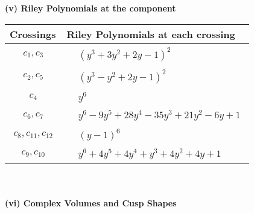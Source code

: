 \documentclass[1p]{elsarticle_modified}
\theoremstyle{definition}
\begin{document}
\newpage\renewcommand{\arraystretch}{1}
\flushleft \textbf{(v) Riley Polynomials at the component}\newline \\
\begin{tabular}{m{50pt}|m{274pt}}
Crossings & \hspace{64pt}Riley Polynomials at each crossing \\
\hline $$\begin{aligned}c_{1},c_{3}\end{aligned}$$&$\begin{aligned}
&(y^3+3 y^2+2 y-1)^2
\end{aligned}$\\
\hline $$\begin{aligned}c_{2},c_{5}\end{aligned}$$&$\begin{aligned}
&(y^3- y^2+2 y-1)^2
\end{aligned}$\\
\hline $$\begin{aligned}c_{4}\end{aligned}$$&$\begin{aligned}
&y^6
\end{aligned}$\\
\hline $$\begin{aligned}c_{6},c_{7}\end{aligned}$$&$\begin{aligned}
&y^6-9 y^5+28 y^4-35 y^3+21 y^2-6 y+1
\end{aligned}$\\
\hline $$\begin{aligned}c_{8},c_{11},c_{12}\end{aligned}$$&$\begin{aligned}
&(y-1)^6
\end{aligned}$\\
\hline $$\begin{aligned}c_{9},c_{10}\end{aligned}$$&$\begin{aligned}
&y^6+4 y^5+4 y^4+y^3+4 y^2+4 y+1
\end{aligned}$\\
\hline
\end{tabular}\\~\\
\newpage\flushleft \textbf{(vi) Complex Volumes and Cusp Shapes}
\end{document}

